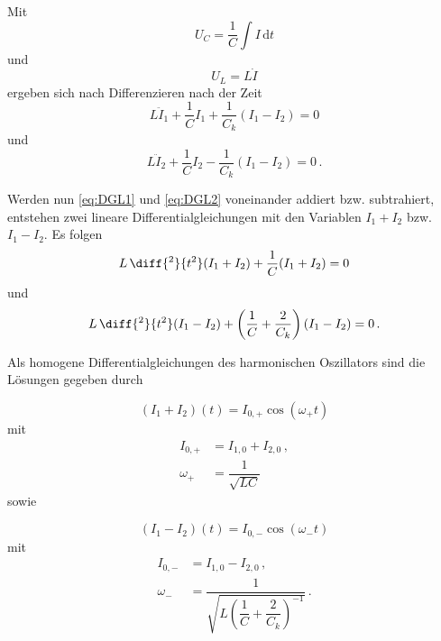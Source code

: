 Mit 
\begin{equation*}
    U_C = \dfrac{1}{C} \int I \, \text{d}t
\end{equation*}
und
\begin{equation*}
    U_L = L \dot{I}
\end{equation*}
ergeben sich nach Differenzieren nach der Zeit
\begin{equation}
    L\ddot{I}_1 + \dfrac{1}{C}I_1 + \dfrac{1}{C_k}(I_1 - I_2) = 0
    \label{eq:DGL1}
\end{equation}
und
\begin{equation}
    L\ddot{I}_2 + \dfrac{1}{C}I_2 - \dfrac{1}{C_k}(I_1 - I_2) = 0\,.
    \label{eq:DGL2}
\end{equation}

Werden nun \eqref{eq:DGL1} und \eqref{eq:DGL2} voneinander addiert bzw. subtrahiert, entstehen zwei lineare Differentialgleichungen mit den Variablen $I_1+I_2$ bzw. $I_1-I_2$.
Es folgen
\begin{equation}
    L \,\diff{^2}{t^2}(I_1+I_2) + \dfrac{1}{C}(I_1 + I_2) = 0
    \label{eq:addDGL}
\end{equation}
und
\begin{equation}
    L \,\diff{^2}{t^2}(I_1 - I_2) + \left(\dfrac{1}{C} + \dfrac{2}{C_k} \right)(I_1 - I_2) = 0\,.
\end{equation}

\newpage

Als homogene Differentialgleichungen des harmonischen Oszillators sind die Lösungen gegeben durch

\begin{equation}
    (I_1+I_2)(t) = I_{0,+} \cos(ω_+t)
    \label{eq:gleiSchwi}
\end{equation}
mit 
\begin{align*}
    I_{0,+} &= I_{1,0}+I_{2,0}\, , \\
    ω_+     &=\dfrac{1}{\sqrt{LC}}
\end{align*}
sowie

\begin{equation*}
    (I_1-I_2)(t) = I_{0,-}\cos(ω_-t)
    \label{eq:gegSchwi}
\end{equation*}
mit 
\begin{align*}
    I_{0,-} &=I_{1,0} - I_{2,0}\, , \\
    ω_-     &= \dfrac{1}{\sqrt{L \left(\dfrac{1}{C}+\dfrac{2}{C_k}\right)^{-1}}}\,.
\end{align*} \\

